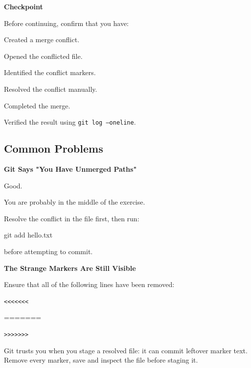 \documentclass{csc2059practical}
\begin{document}
\begin{reflectionbox}
\textbf{Checkpoint}\par
\medskip
Before continuing, confirm that you have:

Created a merge conflict.

Opened the conflicted file.

Identified the conflict markers.

Resolved the conflict manually.

Completed the merge.

Verified the result using \texttt{git log --oneline}.
\end{reflectionbox}
\subsection{Common Problems}
\begin{commonerror}
\textbf{Git Says "You Have Unmerged Paths"}\par
\medskip
Good.

You are probably in the middle of the exercise.

Resolve the conflict in the file first, then run:

\begin{terminalplain}
  git add hello.txt
\end{terminalplain}
before attempting to commit.
\end{commonerror}

\begin{commonerror}
\textbf{The Strange Markers Are Still Visible}\par
\medskip
Ensure that all of the following lines have been removed:

\begin{terminalplain}
  \texttt{<<<<<<<}

  =======
  
  \texttt{>>>>>>>}
\end{terminalplain}

Git trusts you when you stage a resolved file: it can commit leftover marker text. Remove every marker, save and inspect the file before staging it.
\end{commonerror}
\end{document}

